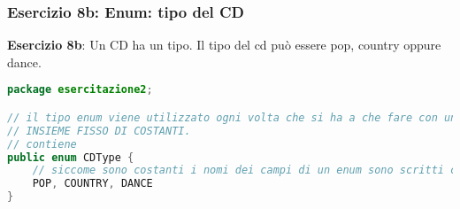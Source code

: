 \documentclass{article}
\begin{document}
\subsubsection{Esercizio 8b: Enum: tipo del CD}
\begin{framed}
\textbf{Esercizio 8b}: Un CD ha un tipo. Il tipo del cd pu\`o essere pop, country oppure dance.
\end{framed}

\begin{lstlisting}[language=Java,escapechar=|]
package esercitazione2;

// il tipo enum viene utilizzato ogni volta che si ha a che fare con un 
// INSIEME FISSO DI COSTANTI. 
// contiene 
public enum CDType {
	// siccome sono costanti i nomi dei campi di un enum sono scritti con lettere upper case
	POP, COUNTRY, DANCE
}
\end{lstlisting}
\end{document}
